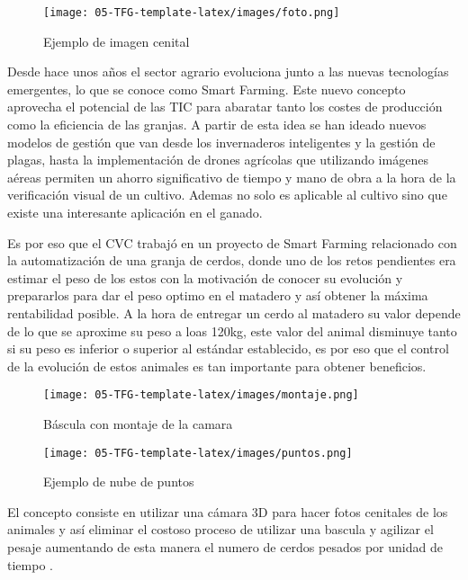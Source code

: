 \documentclass[12pt,a4paper]{article}
\begin{document}
\begin{figure}
\caption{Ejemplo de imagen cenital}
\centering
\texttt{[image: 05-TFG-template-latex/images/foto.png]}
\label{foto}
\end{figure}




Desde hace unos años el sector agrario evoluciona junto a las nuevas tecnologías emergentes, lo que se conoce como Smart Farming. Este nuevo concepto aprovecha el potencial de las TIC para abaratar tanto los costes de producción como la eficiencia de las granjas. A partir de esta idea se han ideado nuevos modelos de gestión que van desde los invernaderos inteligentes y la gestión de plagas, hasta la implementación de drones agrícolas que utilizando imágenes aéreas permiten un ahorro significativo de tiempo y mano de obra a la hora de la verificación visual de un cultivo. Ademas no solo es aplicable al cultivo sino que existe una interesante aplicación en el ganado. 



Es por eso que el CVC trabajó en un proyecto de Smart Farming relacionado con la automatización de una granja de cerdos, donde uno de los retos pendientes era estimar el peso de los estos con la motivación de conocer su evolución y prepararlos para dar el peso optimo en el matadero y así obtener la máxima rentabilidad posible. A la hora de entregar un cerdo al matadero su valor depende de lo que se aproxime su peso a loas 120kg, este valor del animal disminuye tanto si su peso es inferior o superior al estándar establecido, es por eso que el control de la evolución de estos animales es tan importante para obtener beneficios. 

\begin{figure}[h]
\caption{Báscula con montaje de la camara}
\centering
\texttt{[image: 05-TFG-template-latex/images/montaje.png]}
\label{montaje}
\end{figure}
\begin{figure}[h]
\caption{Ejemplo de nube de puntos}
\centering
\texttt{[image: 05-TFG-template-latex/images/puntos.png]}
\label{puntos}
\end{figure}

El concepto consiste en utilizar una cámara 3D para hacer fotos cenitales de los animales y así eliminar el costoso proceso de utilizar una bascula y agilizar el pesaje aumentando de esta manera el numero de cerdos pesados por unidad de tiempo \cite{sistema}.
\end{document}
